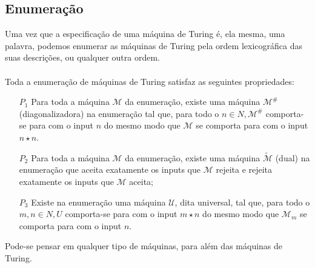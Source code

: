 \documentclass[10pt,a4paper]{report}
\begin{document}
\subsection{Enumeração}
Uma vez que a especificação de uma máquina de Turing é, ela mesma, uma palavra, podemos enumerar as
máquinas de Turing pela ordem lexicográfica das suas
descrições, ou qualquer outra ordem.\\
\\
Toda a enumeração de máquinas de Turing satisfaz as seguintes propriedades:
\begin{itemize}
\item[$P_1$] Para toda a máquina $\mathcal{M}$ da enumeração, existe uma máquina $\mathcal{M}^\#$ (diagonalizadora) na enumeração tal que, para todo o $n \in N, \mathcal{M}^\#$ comporta-se para com o input $n$ do mesmo modo que $\mathcal{M}$ se comporta para com o input $n\star n$.
\item[$P_2$] Para toda a máquina $\mathcal{M}$ da enumeração, existe uma máquina $\widetilde{\mathcal{M}}$ (dual) na enumeração que aceita exatamente os inputs que $\mathcal{M}$ rejeita e rejeita exatamente os inputs que $\mathcal{M}$ aceita;
\item[$P_3$] Existe na enumeração uma máquina $\mathcal{U}$, dita universal, tal que, para
todo o $m, n \in N, U$ comporta-se para com o input $m \star n$ do mesmo modo que $\mathcal{M}_m$ se comporta para com o input $n$.
\end{itemize}
Pode-se pensar em qualquer tipo de máquinas, para além das máquinas de Turing.
\end{document}
